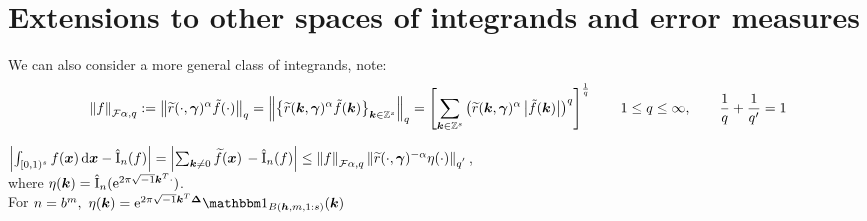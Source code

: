 \documentclass[authoryear]{elsarticle}
\newcommand{\tr}{\widetilde{r}}
\DeclareMathOperator{\appxint}{\hat{I}}
\newcommand{\onetos}{1\!:\!s}
\begin{document}




\section{Extensions to other spaces of integrands and error measures}

We can also consider a more general class of integrands, note: 
$$
\norm[\cf{\alpha,q}]{f} := \norm[q]{\tr(\cdot,\vgamma)^{\alpha}\tilde{f}(\cdot)} = \norm[q]{\big\{\tr(\vk,\vgamma)^{\alpha}\tilde{f}(\vk)\bigr\}_{\vk \in \integers^s}} = \left[\sum_{\vk \in \integers^s} \left(\tr(\vk,\vgamma)^{\alpha}\abs{\tilde{f}(\vk)}\right)^q \right]^{\frac{1}{q}} \qquad 1 \leq q \leq \infty, \qquad\frac{1}{q} + \frac{1}{q'} = 1 
$$

$\abs{\int_{[0,1)^{s}} f(\vx) \, \dif \vx - \appxint_n(f)} = \abs{\sum_{\vk \neq 0} \tf(\vx) \, - \appxint_n(f)}  \leq \norm[\cf{\alpha,q}]{f} \norm[q^{'}]{\tr(\cdot,\vgamma)^{-\alpha} \eta(\cdot)}$, \\ 

where $\eta(\vk) = \appxint_n(\me^{2 \pi \sqrt{-1} \vk^T \cdot})$. \\

For $n = b^m,\  \eta(\vk) = \me^{2 \pi \sqrt{-1} \vk^T \vDelta}\bbone_{B(\vh,m,1:s)}(\vk) $
\end{document}
